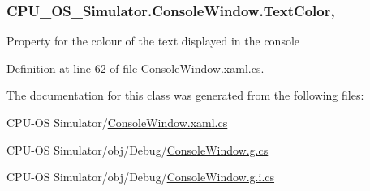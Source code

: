 \subsubsection[{Text\+Color}]{ C\+P\+U\+\_\+\+O\+S\+\_\+\+Simulator.\+Console\+Window.\+Text\+Color\hspace{0.3cm}{\ttfamily [get]}, {\ttfamily [set]}}\label{class_c_p_u___o_s___simulator_1_1_console_window_a9ed1d4cf5229b50e355092d33ea0c3e6}


Property for the colour of the text displayed in the console 



Definition at line 62 of file Console\+Window.\+xaml.\+cs.



The documentation for this class was generated from the following files\+:\begin{DoxyCompactItemize}
\item 
C\+P\+U-\/\+O\+S Simulator/\hyperlink{_console_window_8xaml_8cs}{Console\+Window.\+xaml.\+cs}\item 
C\+P\+U-\/\+O\+S Simulator/obj/\+Debug/\hyperlink{_console_window_8g_8cs}{Console\+Window.\+g.\+cs}\item 
C\+P\+U-\/\+O\+S Simulator/obj/\+Debug/\hyperlink{_console_window_8g_8i_8cs}{Console\+Window.\+g.\+i.\+cs}\end{DoxyCompactItemize}
